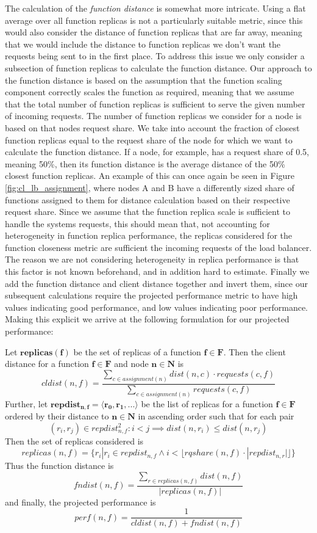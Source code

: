 The calculation of the \textit{function distance} is somewhat more intricate.
Using a flat average over all function replicas is not a particularly suitable metric, since this would also consider the distance of function replicas that are far away, meaning that we would include the distance to function replicas we don't want the requests being sent to in the first place.
To address this issue we only consider a subsection of function replicas to calculate the function distance.
Our approach to the function distance is based on the assumption that the function scaling component correctly scales the function as required, meaning that we assume that the total number of function replicas is sufficient to serve the given number of incoming requests.
The number of function replicas we consider for a node is based on that nodes request share. We take into account the fraction of closest function replicas equal to the request share of the node for which we want to calculate the function distance.
If a node, for example, has a request share of 0.5, meaning 50\%, then its function distance is the average distance of the 50\% closest function replicas.
An example of this can once again be seen in Figure \ref{fig:cl_lb_assignment}, where nodes A and B have a differently sized share of functions assigned to them for distance calculation based on their respective request share.
Since we assume that the function replica scale is sufficient to handle the systems requests, this should mean that, not accounting for heterogeneity in function replica performance, the replicas considered for the function closeness metric are sufficient the incoming requests of the load balancer.
The reason we are not considering heterogeneity in replica performance is that this factor is not known beforehand, and in addition hard to estimate.
Finally we add the function distance and client distance together and invert them, since our subsequent calculations require the projected performance metric to have high values indicating good performance, and low values indicating poor performance.
Making this explicit we arrive at the following formulation for our projected performance:

Let $\mathbf{replicas(f)}$ be the set of replicas of a function $\mathbf{f \in F}$.
Then the client distance for a function $\mathbf{f \in F}$ and node $\mathbf{n \in N}$ is
\[cldist(n,f) = \frac{\sum_{c \in assignment(n)}dist(n,c) \cdot requests(c,f)}{\sum_{c \in assignment(n)}requests(c,f)} \]
Further, let $\mathbf{repdist_{n,f} = \langle r_{0}, r_{1}, ... \rangle}$ be the list of replicas for a function $\mathbf{f \in F}$ ordered by their distance to $\mathbf{n \in N}$ in ascending order such that for each pair 
\[(r_{i},r_{j}) \in repdist_{n,f}^{2}: i < j \implies dist(n, r_{i}) \leq dist(n, r_{j})\]
Then the set of replicas considered is
\[replicas(n,f) = \{r_{i} | r_{i} \in repdist_{n,f} \land i < \lfloor rqshare(n,f) \cdot |repdist_{n,r}| \rfloor\}\]
Thus the function distance is
\[fndist(n,f) = \frac{\sum_{r \in replicas(n,f)}dist(n,f)}{|replicas(n,f)|} \]
and finally, the projected performance is
\[perf(n,f) = \frac{1}{cldist(n,f) + fndist(n,f)} \]

